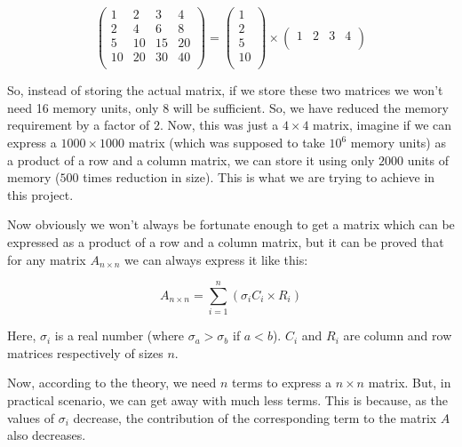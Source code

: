 		$$
		\left(
		\begin{matrix}
			1 & 2 & 3 & 4\\
			2 & 4 & 6 & 8\\
			5 & 10 & 15 & 20\\
			10 & 20 & 30 & 40\\
		\end{matrix}
		\right)=
		\left(
			\begin{matrix}
				1\\
				2\\
				5\\
				10\\
			\end{matrix}
		\right)\times
		\left(
			\begin{matrix}
				1 & 2 & 3 & 4\\
			\end{matrix}
		\right)
		$$

		So, instead of storing the actual matrix, if we store these two matrices we won't need 16 memory units, only $8$ will be sufficient. So, we have reduced the memory requirement by a factor of $2$. Now, this was just a $4\times4$ matrix, imagine if we can express a $1000\times1000$ matrix (which was supposed to take $10^6$ memory units) as a product of a row and a column matrix, we can store it using only $2000$ units of memory ($500$ times reduction in size). This is what we are trying to achieve in this project.

		Now obviously we won't always be fortunate enough to get a matrix which can be expressed as a product of a row and a column matrix, but it can be proved that for any matrix $A_{n\times n}$ we can always express it like this:

		$$A_{n\times n} = \sum_{i=1}^n (\sigma_iC_i\times R_i)$$

		Here, $\sigma_i$ is a real number (where $\sigma_a>\sigma_b$ if $a<b$). $C_i$ and $R_i$ are column and row matrices respectively of sizes $n$.

		Now, according to the theory, we need $n$ terms to express a $n\times n$ matrix. But, in practical scenario, we can get away with much less terms. This is because, as the values of $\sigma_i$ decrease, the contribution of the corresponding term to the matrix $A$ also decreases.





